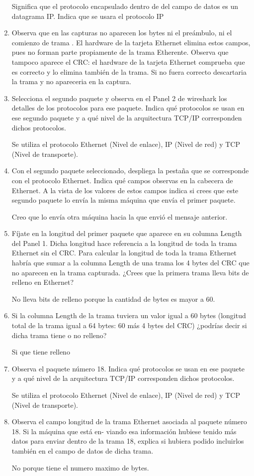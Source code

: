 \documentclass[12pt, a4paper]{report}
\begin{document}
\begin{enumerate}
	Significa que el protocolo encapsulado dentro de del campo de datos es un datagrama IP. Indica que se usara el protocolo IP
	\item Observa que en las capturas no aparecen los bytes ni el preámbulo, ni el comienzo de trama . El hardware de
	la tarjeta Ethernet elimina estos campos, pues no forman parte propiamente de la trama Etherente. Observa
	que tampoco aparece el CRC: el hardware de la tarjeta Ethernet comprueba que es correcto y lo elimina
	también de la trama. Si no fuera correcto descartaria la trama y no apareceria en la captura.
	\item Selecciona el segundo paquete y observa en el Panel 2 de wireshark los detalles de los protocolos para ese
	paquete. Indica qué protocolos se usan en ese segundo paquete y a qué nivel de la arquitectura TCP/IP
	corresponden dichos protocolos.
	
	Se utiliza el protocolo Ethernet (Nivel de enlace), IP (Nivel de red) y TCP (Nivel de transporte).
	\item Con el segundo paquete seleccionado, despliega la pestaña que se corresponde con el protocolo Ethernet.
	Indica qué campos observas en la cabecera de Ethernet. A la vista de los valores de estos campos indica si
	crees que este segundo paquete lo envía la misma máquina que envía el primer paquete.
	
	Creo que lo envía otra máquina hacia la que envió el mensaje anterior.
	\item Fíjate en la longitud del primer paquete que aparece en su columna Length del Panel 1. Dicha longitud hace referencia a la longitud de toda la trama Ethernet sin el CRC. Para calcular la longitud de toda la trama
	Ethernet habría que sumar a la columna Length de una trama los 4 bytes del CRC que no aparecen en la
	trama capturada. ¿Crees que la primera trama lleva bits de relleno en Ethernet?
	
	No lleva bits de relleno porque la cantidad de bytes es mayor a 60.
	\item Si la columna Length de la trama tuviera un valor igual a 60 bytes (longitud total de la trama igual a 64
	bytes: 60 más 4 bytes del CRC) ¿podrías decir si dicha trama tiene o no relleno?
	
	Si que tiene relleno
	\item Observa el paquete número 18. Indica qué protocolos se usan en ese paquete y a qué nivel de la arquitectura
	TCP/IP corresponden dichos protocolos.
	
	Se utiliza el protocolo Ethernet (Nivel de enlace), IP (Nivel de red) y TCP (Nivel de transporte).
	\item Observa el campo longitud de la trama Ethernet asociada al paquete número 18. Si la máquina que está en-
	viando esa información hubiese tenido más datos para enviar dentro de la trama 18, explica si hubiera podido
	incluirlos también en el campo de datos de dicha trama.
	
	No porque tiene el numero maximo de bytes.
\end{enumerate}
\end{document}
